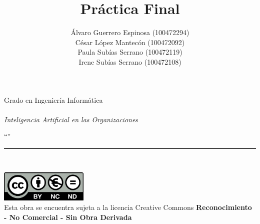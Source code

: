 \documentclass[12pt]{report} %
\begin{document}

\title{Práctica Final}
\author{Álvaro Guerrero Espinosa (100472294)\\
        César López Mantecón (100472092)\\
        Paula Subías Serrano (100472119)\\
        Irene Subías Serrano (100472108)\\}

\makeatletter
\begin{titlepage}
    \begin{sffamily}
    \color{azulUC3M}
    \begin{center}
        \begin{figure}[H] %
        \end{figure}
        \vspace{2.5cm}
        \begin{Large}
            Grado en Ingeniería Informática\\
            \@date\\
            \vspace{2cm}
            \textsl{Inteligencia Artificial en las Organizaciones}\\
            \bigskip
        \end{Large}
        {\Huge ``\@title''}\\
        \vspace*{0.5cm}
        \rule{10.5cm}{0.1mm}\\
        \vspace*{0.9cm}
        {\LARGE\@author}
        \vspace*{1cm}
    \end{center}
    \vfill
    \color{black}
    \includegraphics[width=4.2cm]{creativecommons.png}\\ %
    Esta obra se encuentra sujeta a la licencia Creative Commons \textbf{Reconocimiento - No Comercial - Sin Obra Derivada}
    \end{sffamily}
\end{titlepage}
\makeatother
\end{document}
